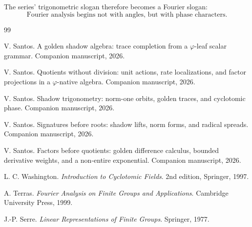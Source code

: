 \documentclass[11pt]{article}
\begin{document}
The series' trigonometric slogan therefore becomes a Fourier slogan:
\[
    \boxed{\text{Fourier analysis begins not with angles, but with phase characters.}}
\]

\begin{thebibliography}{99}

V. Santos.
\newblock A golden shadow algebra: trace completion from a \(\varphi\)-leaf scalar grammar.
\newblock Companion manuscript, 2026.

V. Santos.
\newblock Quotients without division: unit actions, rate localizations, and factor projections in a \(\varphi\)-native algebra.
\newblock Companion manuscript, 2026.

V. Santos.
\newblock Shadow trigonometry: norm-one orbits, golden traces, and cyclotomic phase.
\newblock Companion manuscript, 2026.

V. Santos.
\newblock Signatures before roots: shadow lifts, norm forms, and radical spreads.
\newblock Companion manuscript, 2026.

V. Santos.
\newblock Factors before quotients: golden difference calculus, bounded derivative weights, and a non-entire exponential.
\newblock Companion manuscript, 2026.

L. C. Washington.
\newblock \emph{Introduction to Cyclotomic Fields}.
\newblock 2nd edition, Springer, 1997.

A. Terras.
\newblock \emph{Fourier Analysis on Finite Groups and Applications}.
\newblock Cambridge University Press, 1999.

J.-P. Serre.
\newblock \emph{Linear Representations of Finite Groups}.
\newblock Springer, 1977.

\end{thebibliography}
\end{document}
